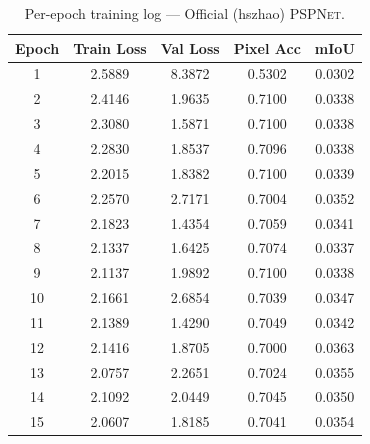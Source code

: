 \documentclass[12pt,a4paper]{article}
\newcommand{\pspnet}{\textsc{PSPNet}}
\newcommand{\offpsp}{Official (hszhao) \pspnet{}}
\begin{document}
\begin{table}[H]
\centering
\caption{Per-epoch training log — \offpsp{}.}
\label{tab:log_official}
\small
\begin{tabular}{ccccc}
\toprule
\textbf{Epoch} & \textbf{Train Loss} & \textbf{Val Loss} & \textbf{Pixel Acc} & \textbf{mIoU} \\
\midrule
1  & 2.5889 & 8.3872 & 0.5302 & 0.0302 \\
2  & 2.4146 & 1.9635 & 0.7100 & 0.0338 \\
3  & 2.3080 & 1.5871 & 0.7100 & 0.0338 \\
4  & 2.2830 & 1.8537 & 0.7096 & 0.0338 \\
5  & 2.2015 & 1.8382 & 0.7100 & 0.0339 \\
6  & 2.2570 & 2.7171 & 0.7004 & 0.0352 \\
7  & 2.1823 & 1.4354 & 0.7059 & 0.0341 \\
8  & 2.1337 & 1.6425 & 0.7074 & 0.0337 \\
9  & 2.1137 & 1.9892 & 0.7100 & 0.0338 \\
10 & 2.1661 & 2.6854 & 0.7039 & 0.0347 \\
11 & 2.1389 & 1.4290 & 0.7049 & 0.0342 \\
12 & 2.1416 & 1.8705 & 0.7000 & 0.0363 \\
13 & 2.0757 & 2.2651 & 0.7024 & 0.0355 \\
14 & 2.1092 & 2.0449 & 0.7045 & 0.0350 \\
15 & 2.0607 & 1.8185 & 0.7041 & 0.0354 \\
\bottomrule
\end{tabular}
\end{table}
\end{document}
